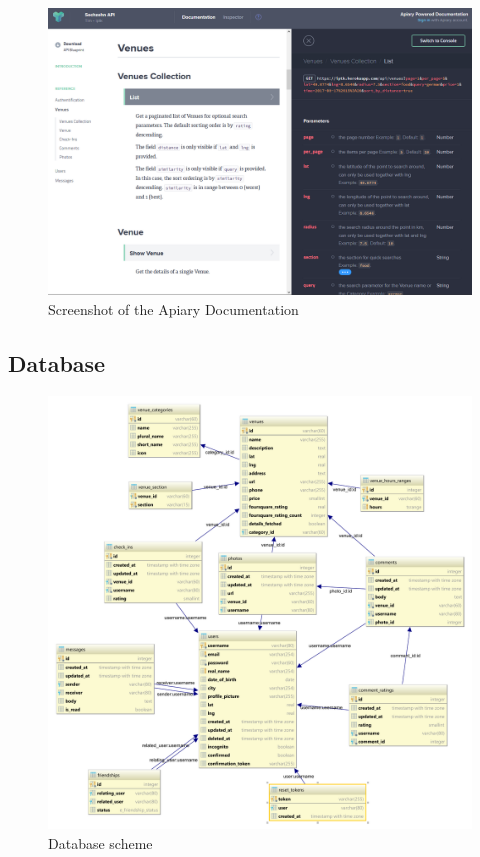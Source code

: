 \documentclass[11pt, accentcolor=tud1c]{tudreport}
\begin{document}
\begin{figure}[ht]
	\includegraphics[width=\textwidth]{./res/apiary.png}
	\caption{Screenshot of the Apiary Documentation}
	\label{fig:apiary}
\end{figure}
\newpage

\subsection{Database}
\begin{figure}[ht]
	\includegraphics[width=\textwidth]{./res/sechzehn-erm.pdf}
	\caption{Database scheme}
	\label{fig:database_scheme}
\end{figure}
\end{document}
